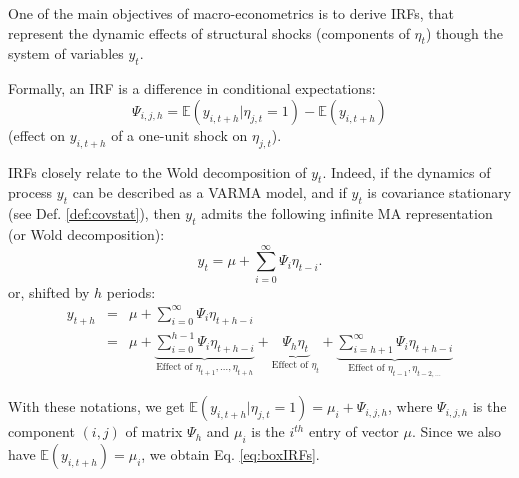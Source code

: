 \documentclass[
  12pt,
]{book}
\theoremstyle{definition}
\theoremstyle{definition}
\theoremstyle{definition}
\theoremstyle{definition}
\theoremstyle{remark}
\begin{document}
One of the main objectives of macro-econometrics is to derive IRFs, that represent the dynamic effects of structural shocks (components of \(\eta_t\)) though the system of variables \(y_t\).

Formally, an IRF is a difference in conditional expectations:
\begin{equation}
\boxed{\Psi_{i,j,h} = \mathbb{E}(y_{i,t+h}|\eta_{j,t}=1) - \mathbb{E}(y_{i,t+h})}
\label{eq:boxIRFs}
\end{equation}
(effect on \(y_{i,t+h}\) of a one-unit shock on \(\eta_{j,t}\)).

IRFs closely relate to the Wold decomposition of \(y_t\). Indeed, if the dynamics of process \(y_t\) can be described as a VARMA model, and if \(y_t\) is covariance stationary (see Def. \ref{def:covstat}), then \(y_t\) admits the following infinite MA representation (or Wold decomposition):
\begin{equation}
\boxed{y_t = \mu + \sum_{i=0}^\infty \Psi_{i} \eta_{t-i}.}
\label{eq:InfMA}
\end{equation}
or, shifted by \(h\) periods:
\begin{eqnarray*}
y_{t+h} &=& \mu + \sum_{i=0}^\infty \Psi_{i} \eta_{t+h-i}\\
&=& \mu + \underbrace{\sum_{i=0}^{h-1} \Psi_{i} \eta_{t+h-i}}_{\mbox{Effect of }\eta_{t+1},\dots,\eta_{t+h}} + \underbrace{\Psi_{h} \eta_{t}}_{\mbox{Effect of }\eta_{t}} + \underbrace{\sum_{i=h+1}^\infty \Psi_{i} \eta_{t+h-i}}_{\mbox{Effect of }\eta_{t-1},\eta_{t-2,\dots}}
\end{eqnarray*}

With these notations, we get \(\mathbb{E}(y_{i,t+h}|\eta_{j,t}=1) = \mu_i + \Psi_{i,j,h}\), where \(\Psi_{i,j,h}\) is the component \((i,j)\) of matrix \(\Psi_h\) and \(\mu_i\) is the \(i^{th}\) entry of vector \(\mu\). Since we also have \(\mathbb{E}(y_{i,t+h})=\mu_i\), we obtain Eq. \eqref{eq:boxIRFs}.
\end{document}
